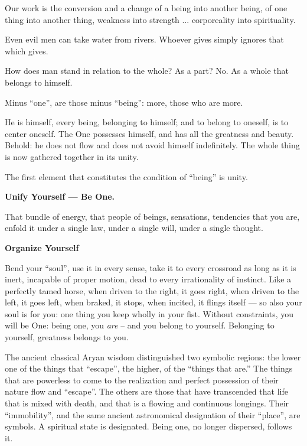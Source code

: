 \begin{quotex}
Our work is the conversion and a change of a being into another being, of one thing into another thing, weakness into strength ... corporeality into spirituality.

Even evil men can take water from rivers. Whoever gives simply ignores that which gives.

How does man stand in relation to the whole? As a part? No. As a whole that belongs to himself.

Minus ``one'', are those minus ``being'': more, those who are more.

He is himself, every being, belonging to himself; and to belong to oneself, is to center oneself. The One possesses himself, and has all the greatness and beauty. Behold: he does not flow and does not avoid himself indefinitely. The whole thing is now gathered together in its unity.
\end{quotex}


The first element that constitutes the condition of ``being'' is unity.

\textbf{Unify Yourself --- Be One.}


That bundle of energy, that people of beings, sensations, tendencies that you are, enfold it under a single law, under a single will, under a single thought.

\textbf{Organize Yourself}


Bend your ``soul'', use it in every sense, take it to every crossroad as long as it is inert, incapable of proper motion, dead to every irrationality of instinct. Like a perfectly tamed horse, when driven to the right, it goes right, when driven to the left, it goes left, when braked, it stops, when incited, it flings itself --- so also your soul is for you: one thing you keep wholly in your fist. Without constraints, you will be One: being one, you \emph{are} -- and you belong to yourself. Belonging to yourself, greatness belongs to you.

The ancient classical Aryan wisdom distinguished two symbolic regions: the lower one of the things that ``escape'', the higher, of the ``things that are.'' The things that are powerless to come to the realization and perfect possession of their nature flow and ``escape''. The others are those that have transcended that life that is mixed with death, and that is a flowing and continuous longings. Their ``immobility'', and the same ancient astronomical designation of their ``place'', are symbols. A spiritual state is designated. Being one, no longer dispersed, follows it.

